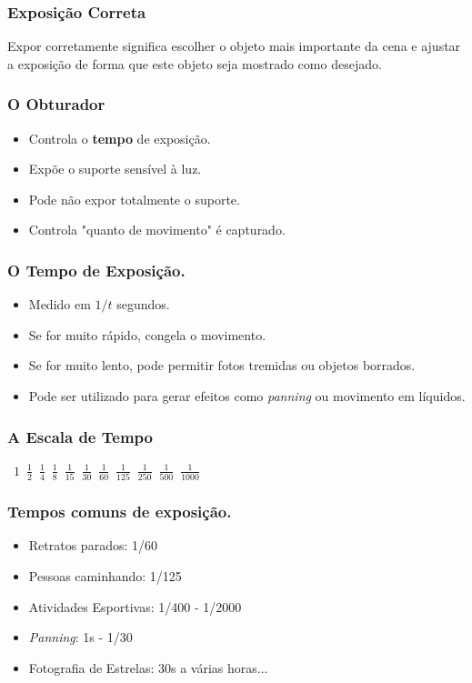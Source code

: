 \begin{frame}
    \frametitle{Exposição Correta}
    Expor corretamente significa escolher o objeto mais importante da cena e
    ajustar a exposição de forma que este objeto seja mostrado como desejado.
\end{frame}

\begin{frame}
    \frametitle{O Obturador}
    \begin{itemize}
        \item Controla o \textbf{tempo} de exposição.
        \item Expõe o suporte sensível à luz.
        \item Pode não expor totalmente o suporte.
        \item Controla "quanto de movimento" é capturado.
    \end{itemize}
\end{frame}

\begin{frame}
    \frametitle{O Tempo de Exposição.}
    \begin{itemize}
        \item Medido em $1/t$ segundos.
        \item Se for muito rápido, congela o movimento.
        \item Se for muito lento, pode permitir fotos tremidas ou objetos borrados.
        \item Pode ser utilizado para gerar efeitos como \textit{panning} ou movimento em líquidos.
    \end{itemize}
\end{frame}

\begin{frame}
    \frametitle{A Escala de Tempo}
    \vfill
    \begin{center}
    \mbox{
    \huge $1$
    \hfill
    \huge $\frac{1}{2}$
    \hfill
    \huge $\frac{1}{4}$
    \hfill
    \huge $\frac{1}{8}$
    \hfill
    \huge $\frac{1}{15}$
    \hfill
    \huge $\frac{1}{30}$
    \hfill
    \huge $\frac{1}{60}$
    \hfill
    \huge $\frac{1}{125}$
    \hfill
    \huge $\frac{1}{250}$
    \hfill
    \huge $\frac{1}{500}$
    \hfill
    \huge $\frac{1}{1000}$
    }
    \end{center}
    \vfill
\end{frame}

\begin{frame}
    \frametitle{Tempos comuns de exposição.}
    \begin{itemize}
        \item Retratos parados: 1/60
        \item Pessoas caminhando: 1/125
        \item Atividades Esportivas: 1/400 - 1/2000
        \item \textit{Panning}: 1s - 1/30
        \item Fotografia de Estrelas: 30s a várias horas...
    \end{itemize}
\end{frame}


